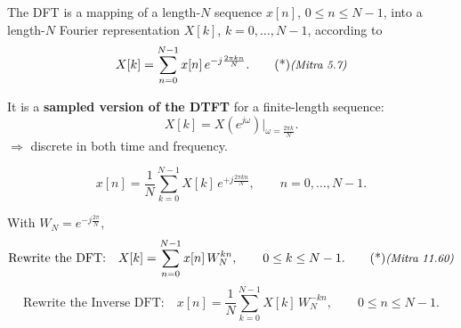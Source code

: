 \documentclass[handout_subfiles_root.tex]{subfiles}
\begin{document}
\maketitle


\begin{defbox}[title={Def}]
The DFT is a mapping of a length-$N$ sequence $x[n]$, $0\le n\le N-1$, into a length-$N$ Fourier representation $X[k]$, $k=0,\dots,N-1$, according to
\begin{equation*}
X[k] = \sum_{n=0}^{N-1} x[n]\,e^{-j\frac{2\pi kn}{N}}. \MitraTag{5.7}
\end{equation*}
\end{defbox}

\noindent It is a \textbf{sampled version of the DTFT} for a finite-length sequence:\footnotemark{}
\begin{equation*}
X[k] = X(e^{j\omega})\Big|_{\omega=\frac{2\pi k}{N}}.
\end{equation*}
$\Rightarrow$ discrete in both time and frequency.

\begin{defbox}[title={Inverse DFT}]
\begin{equation*}
x[n] = \frac{1}{N}\sum_{k=0}^{N-1} X[k]\,e^{+j\frac{2\pi kn}{N}}, \qquad n=0,\dots,N-1.
\end{equation*}
\end{defbox}


With $W_N = e^{-j\frac{2\pi}{N}}$,
\begin{equation*}
\text{Rewrite the DFT:}\quad
X[k] = \sum_{n=0}^{N-1} x[n]\,W_N^{kn}, \qquad 0\le k\le N-1. \MitraTag{11.60}
\end{equation*}
\begin{equation*}
\text{Rewrite the Inverse DFT:}\quad
x[n] = \frac{1}{N}\sum_{k=0}^{N-1} X[k]\,W_N^{-kn}, \qquad 0\le n\le N-1.
\end{equation*}
\end{document}
